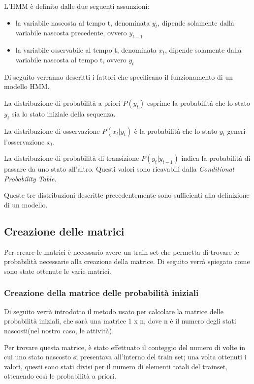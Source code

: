 \documentclass[10pt,a4paper]{article}
\begin{document}
	L'HMM è definito dalle due seguenti assunzioni:
	
	\begin{itemize}
		\item la variabile nascosta al tempo t, denominata $ y_{t} $, dipende solamente dalla variabile nascosta precedente, ovvero $ y_{t - 1} $
		\item la variabile osservabile al tempo t, denominata $ x_{t} $, dipende solamente dalla variabile nascosta al tempo t, ovvero $ y_{t} $
	\end{itemize}
	
	Di seguito verranno descritti i fattori che specificano il funzionamento di un modello HMM.
	
	La distribuzione di probabilità a priori $ P(y_{t}) $ esprime la probabilità che lo stato $ y_{t} $ sia lo stato iniziale della sequenza.
	
	La distribuzione di osservazione $ P(x_{t} | y_{t}) $ è la probabilità che lo stato $ y_{t} $ generi l'osservazione $ x_{t} $.
	
	La distribuzione di probabilità di transizione $ P(y_{t} | y_{t - 1}) $ indica la probabilità di passare da uno stato all'altro. Questi valori sono ricavabili dalla \textit{Conditional Probability Table}.
	
	Queste tre distribuzioni descritte precedentemente sono sufficienti alla definizione di un modello.
	
	\subsection{Creazione delle matrici}
	Per creare le matrici è necessario avere un train set che permetta di trovare le probabilità necessarie alla creazione della matrice.
	Di seguito verrà spiegato come sono state ottenute le varie matrici.
	
	\subsubsection{Creazione della matrice delle probabilità iniziali}
	Di seguito verrà introdotto il metodo usato per calcolare la matrice delle probabilità iniziali, che sarà una matrice  1 x n, dove n è il numero degli stati nascosti(nel nostro caso, le attività).
	
	Per trovare questa matrice, è stato effettuato il conteggio del numero di volte in cui uno stato nascosto si presentava all'interno del train set; una volta ottenuti i valori, questi sono stati divisi per il numero di elementi totali del trainset, ottenendo così le probabilità a priori.
	
\end{document}
